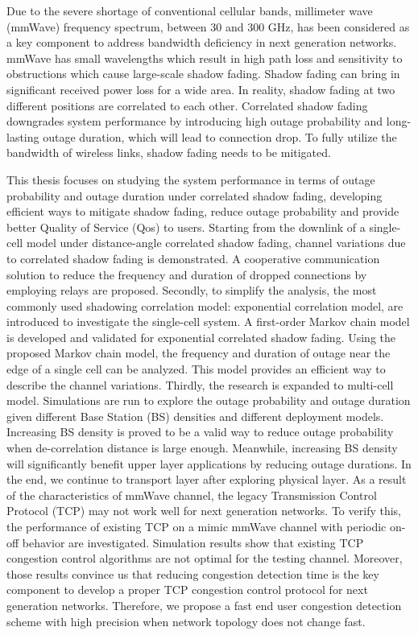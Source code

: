 \par Due to the severe shortage of conventional cellular bands, millimeter wave (mmWave) frequency spectrum, between 30 and 300 GHz, has been considered as a key component to address bandwidth deficiency in next generation networks. mmWave has small wavelengths which result in high path loss and sensitivity to obstructions which cause large-scale shadow fading. Shadow fading can bring in significant received power loss for a wide area. In reality, shadow fading at two different positions are correlated to each other. Correlated shadow fading downgrades system performance by introducing high outage probability and long-lasting outage duration, which will lead to connection drop. To fully utilize the bandwidth of wireless links, shadow fading needs to be mitigated.
\par This thesis focuses on studying the system performance in terms of outage probability and outage duration under correlated shadow fading, developing efficient ways to mitigate shadow fading, reduce outage probability and provide better Quality of Service (Qos) to users. Starting from the downlink of a single-cell model under distance-angle correlated shadow fading, channel variations due to correlated shadow fading is demonstrated. A cooperative communication solution to reduce the frequency and duration of dropped connections by employing relays are proposed. Secondly, to simplify the analysis, the most commonly used shadowing correlation model: exponential correlation model, are introduced to investigate the single-cell system. A first-order Markov chain model is developed and validated for exponential correlated shadow fading. Using the proposed Markov chain model, the frequency and duration of outage near the edge of a single cell can be analyzed. This model provides an efficient way to describe the channel variations. Thirdly, the research is expanded to multi-cell model. Simulations are run to explore the outage probability and outage duration given different Base Station (BS) densities and different deployment models. Increasing BS density is proved to be a valid way to reduce outage probability when de-correlation distance is large enough. Meanwhile, increasing BS density will significantly benefit upper layer applications by reducing outage durations. In the end, we continue to transport layer after exploring physical layer. As a result of the characteristics of mmWave channel, the legacy Transmission Control Protocol (TCP) may not work well for next generation networks. To verify this, the performance of existing TCP on a mimic mmWave channel with periodic on-off behavior are investigated. Simulation results show that existing TCP congestion control algorithms are not optimal for the testing channel. Moreover, those results convince us that reducing congestion detection time is the key component to develop a proper TCP congestion control protocol for next generation networks. Therefore, we propose a fast end user congestion detection scheme with high precision when network topology does not change fast.


